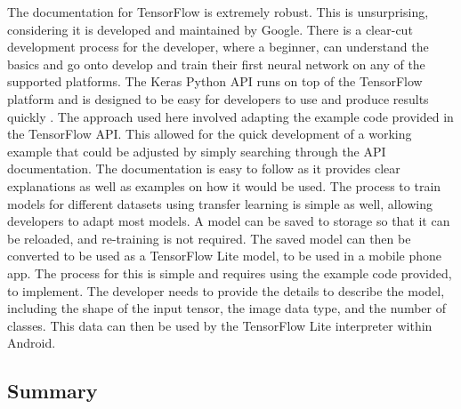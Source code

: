\documentclass[12pt,a4paper]{report}
\begin{document}
\par

The documentation for TensorFlow is extremely robust. This is unsurprising, considering it is developed and maintained 
by Google. There is a clear-cut development process for the developer, where a beginner, can understand the basics and 
go onto develop and train their first neural network on any of the supported platforms. The Keras Python API runs on 
top of the TensorFlow platform and is designed to be easy for developers to use and produce results quickly 
\citep{kerasabout}. The approach used here involved adapting the example code provided in the TensorFlow API. This allowed
for the quick development of a working example that could be adjusted by simply searching through the API documentation. The 
documentation is easy to follow as it provides clear explanations as well as examples on how it would be used. The 
process to train models for different datasets using transfer learning is simple as well, allowing developers to adapt most
models. A model can be saved to storage so that it can be reloaded, and re-training is not required. The saved 
model can then be converted to be used as a TensorFlow Lite model, to be used in a mobile phone app. The process for this
is simple and requires using the example code provided, to implement. The developer needs to provide the 
details to describe the model, including the shape of the input tensor, the image data type, and the number of classes. 
This data can then be used by the TensorFlow Lite interpreter within Android.

\subsection{Summary}
\end{document}

